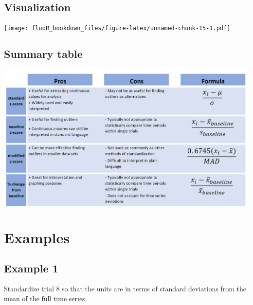 \documentclass[
]{book}
\newenvironment{Shaded}{\begin{snugshade}}{\end{snugshade}}
\newcommand{\DataTypeTok}[1]{\textcolor[rgb]{0.13,0.29,0.53}{#1}}
\newcommand{\KeywordTok}[1]{\textcolor[rgb]{0.13,0.29,0.53}{\textbf{#1}}}
\newcommand{\NormalTok}[1]{#1}
\newcommand{\OperatorTok}[1]{\textcolor[rgb]{0.81,0.36,0.00}{\textbf{#1}}}
\newcommand{\StringTok}[1]{\textcolor[rgb]{0.31,0.60,0.02}{#1}}
\begin{document}
\hypertarget{stand-comparison-vis}{%
\subsection{Visualization}\label{stand-comparison-vis}}

\texttt{[image: fluoR\_bookdown\_files/figure-latex/unnamed-chunk-15-1.pdf]}

\hypertarget{stand-comparison-table}{%
\subsection{Summary table}\label{stand-comparison-table}}

\includegraphics{./external_figures/tables/standardization_table.png}

\hypertarget{stand-examples}{%
\section{Examples}\label{stand-examples}}

\hypertarget{stand-examples-ex1}{%
\subsection{Example 1}\label{stand-examples-ex1}}

Standardize trial 8 so that the units are in terms of standard deviations from the mean of the full time series.

\begin{Shaded}
\end{Shaded}
\end{document}
